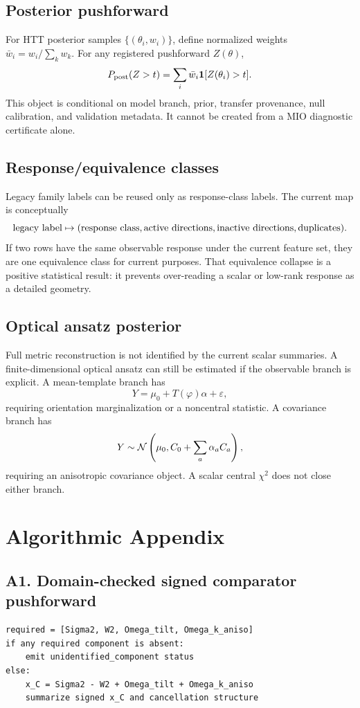 \documentclass[11pt]{article}
\newcommand{\Ppost}{P_{\rm post}}
\begin{document}
\subsection{Posterior pushforward}
For HTT posterior samples \(\{(\theta_i,w_i)\}\), define normalized weights \(\bar w_i=w_i/\sum_kw_k\).  For any registered pushforward \(Z(\theta)\),
\[
  \Ppost(Z>t)=\sum_i\bar w_i{\bf 1}[Z(\theta_i)>t].
\]
This object is conditional on model branch, prior, transfer provenance, null calibration, and validation metadata.  It cannot be created from a MIO diagnostic certificate alone.

\subsection{Response/equivalence classes}
Legacy family labels can be reused only as response-class labels.  The current map is conceptually
\[
  \hbox{legacy label}\mapsto
  (\hbox{response class},\hbox{active directions},\hbox{inactive directions},\hbox{duplicates}).
\]
If two rows have the same observable response under the current feature set, they are one equivalence class for current purposes.  That equivalence collapse is a positive statistical result: it prevents over-reading a scalar or low-rank response as a detailed geometry.

\subsection{Optical ansatz posterior}
Full metric reconstruction is not identified by the current scalar summaries.  A finite-dimensional optical ansatz can still be estimated if the observable branch is explicit.  A mean-template branch has
\[
  Y=\mu_0+T(\varphi)\alpha+\varepsilon,
\]
requiring orientation marginalization or a noncentral statistic.  A covariance branch has
\[
  Y\sim{\cal N}\left(\mu_0,C_0+\sum_a\alpha_aC_a\right),
\]
requiring an anisotropic covariance object.  A scalar central \(\chi^2\) does not close either branch.

\section{Algorithmic Appendix}
\subsection*{A1. Domain-checked signed comparator pushforward}
\begin{verbatim}
required = [Sigma2, W2, Omega_tilt, Omega_k_aniso]
if any required component is absent:
    emit unidentified_component status
else:
    x_C = Sigma2 - W2 + Omega_tilt + Omega_k_aniso
    summarize signed x_C and cancellation structure
\end{verbatim}
\end{document}
